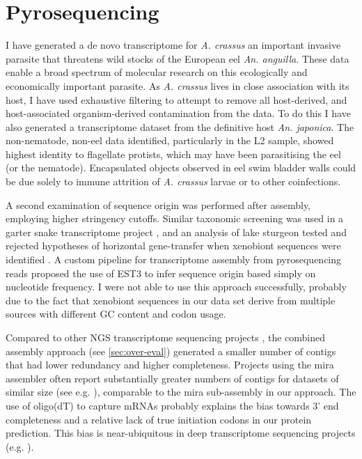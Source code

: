 \section{Pyrosequencing}
\label{sec:454-pyr}

I have generated a de novo transcriptome for \textit{A. crassus} an
important invasive parasite that threatens wild stocks of the European
eel \textit{An. anguilla}. These data enable a broad spectrum of
molecular research on this ecologically and economically important
parasite. As \textit{A. crassus} lives in close association with its
host, I have used exhaustive filtering to attempt to remove all
host-derived, and host-associated organism-derived contamination from
the data. To do this I have also generated a transcriptome dataset
from the definitive host \textit{An. japonica}. The non-nematode,
non-eel data identified, particularly in the L2 sample, showed highest
identity to flagellate protists, which may have been parasitising the
eel (or the nematode). Encapsulated objects observed in eel swim
bladder walls \cite{heitlinger_massive_2009} could be due solely to
immune attrition of \textit{A. crassus} larvae or to other
coinfections.

A second examination of sequence origin was performed after assembly,
employing higher stringency cutoffs. Similar taxonomic screening was
used in a garter snake transcriptome project \cite{pmid21138572}, and
an analysis of lake sturgeon tested and rejected hypotheses of
horizontal gene-transfer when xenobiont sequences were identified
\cite{pmid20386959}. A custom pipeline for transcriptome assembly from
pyrosequencing reads \cite{pmid20034392} proposed the use of EST3
\cite{pmid17218127} to infer sequence origin based simply on
nucleotide frequency. I were not able to use this approach
successfully, probably due to the fact that xenobiont sequences in our
data set derive from multiple sources with different GC content and
codon usage.

Compared to other NGS transcriptome sequencing projects
\cite{pmid20478048}, the combined assembly approach (see
\ref{sec:over-eval}) generated a smaller number of contigs that had
lower redundancy and higher completeness. Projects using the mira
assembler often report substantially greater numbers of contigs for
datasets of similar size (see e.g. \cite{pmid21364769}), comparable to
the mira sub-assembly in our approach. The use of oligo(dT) to capture
mRNAs probably explains the bias towards 3' end completeness and a
relative lack of true initiation codons in our protein
prediction. This bias is near-ubiquitous in deep transcriptome
sequencing projects (e.g. \cite{pmid20331785}).


